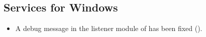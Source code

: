 


 



\subsection{Services for Windows}
\begin{itemize}
\item A debug message in the listener module of
 has been fixed
().
\end{itemize}


